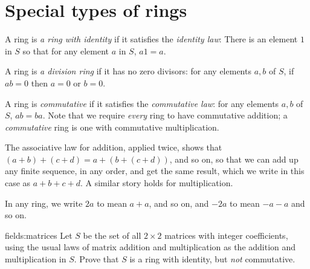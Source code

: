 \section{Special types of rings}
A ring is \emph{a ring with identity} if it satisfies
the \emph{identity law}: There is an element \(1\) in \(S\) so that for any element \(a\) in \(S\), \(a1=a\).

A ring is \emph{a division ring} if it has no zero divisors: for any elements \(a, b\) of \(S\), if \(ab=0\) then \(a=0\) or \(b=0\).

A ring is \emph{commutative} if it satisfies the \emph{commutative law}: for any elements \(a, b\) of \(S\), \(ab=ba\).
Note that we require \emph{every} ring to have commutative addition; a \emph{commutative} ring is one with commutative multiplication.

The associative law for addition, applied twice, shows that \((a+b)+(c+d)=a+(b+(c+d))\), and so on, so that we can add up any finite sequence, in any order, and get the same result, which we write in this case as \(a+b+c+d\).
A similar story holds for multiplication.

In any ring, we write \(2a\) to mean \(a+a\), and so on, and \(-2a\) to mean \(-a-a\) and so on.

\begin{problem}{fields:matrices}
Let \(S\) be the set of all \(2 \times 2\) matrices with integer coefficients, using the usual laws of matrix addition and multiplication as the addition and multiplication in \(S\).
Prove that \(S\) is a ring with identity, but \emph{not} commutative.
\end{problem}

